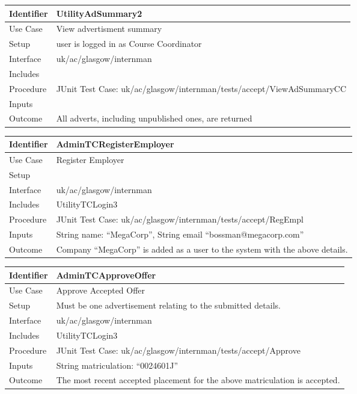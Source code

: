 \vspace{2em}

\begin{tabularx}{\textwidth}{|T|L|}
\hline
Identifier & UtilityAdSummary2\\
\hline
Use Case & View advertisment summary\\
\hline
Setup & user is logged in as Course Coordinator\\
\hline
Interface & uk/ac/glasgow/internman\\
\hline
Includes &\\
\hline
Procedure & JUnit Test Case: uk/ac/glasgow/internman/tests/accept/ViewAdSummaryCC\\
\hline
Inputs &\\
\hline
Outcome & All adverts, including unpublished ones, are returned\\
\hline
\end{tabularx}

\vspace{2em}

\vspace{2em}
\begin{tabularx}{\textwidth}{|T|L|}
\hline
Identifier & AdminTCRegisterEmployer\\
\hline
Use Case & Register Employer\\
\hline
Setup & \\
\hline
Interface & uk/ac/glasgow/internman\\
\hline
Includes & UtilityTCLogin3\\
\hline
Procedure & JUnit Test Case: uk/ac/glasgow/internman/tests/accept/RegEmpl\\
\hline
Inputs & String name: ``MegaCorp'', String email ``bossman@megacorp.com''\\
\hline
Outcome & Company ``MegaCorp'' is added as a user to the system with
the above details.\\
\hline
\end{tabularx}

\vspace{2em}

\begin{tabularx}{\textwidth}{|T|L|}
\hline
Identifier & AdminTCApproveOffer\\
\hline
Use Case & Approve Accepted Offer\\
\hline
Setup & Must be one advertisement relating to the submitted details.\\
\hline
Interface & uk/ac/glasgow/internman\\
\hline
Includes & UtilityTCLogin3\\
\hline
Procedure & JUnit Test Case: uk/ac/glasgow/internman/tests/accept/Approve\\
\hline
Inputs & String matriculation: ``0024601J''\\
\hline
Outcome & The most recent accepted placement for the above
matriculation is accepted.\\
\hline
\end{tabularx}

